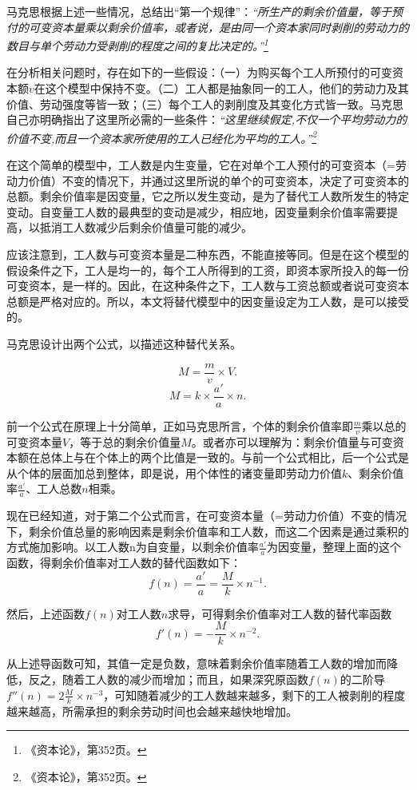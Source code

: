 \documentclass[a4paper,11pt]{ctexart}
\begin{document}
马克思根据上述一些情况，总结出“第一个规律”：\textit{“所生产的剩余价值量，等于预付的可变资本量乘以剩余价值率，或者说，是由同一个资本家同时剥削的劳动力的数目与单个劳动力受剥削的程度之间的复比决定的。”\footnote{《资本论》，第352页。}}

在分析相关问题时，存在如下的一些假设：（一）为购买每个工人所预付的可变资本额$v$在这个模型中保持不变。（二）工人都是抽象同一的工人，他们的劳动力及其价值、劳动强度等皆一致；（三）每个工人的剥削度及其变化方式皆一致。马克思自己亦明确指出了这里所必需的一些条件：\textit{“这里继续假定,不仅一个平均劳动力的价值不变,而且一个资本家所使用的工人已经化为平均的工人。”\footnote{《资本论》，第352页。}}

在这个简单的模型中，工人数是内生变量，它在对单个工人预付的可变资本（=劳动力价值）不变的情况下，并通过这里所说的单个的可变资本，决定了可变资本的总额。剩余价值率是因变量，它之所以发生变动，是为了替代工人数所发生的特定变动。自变量工人数的最典型的变动是减少，相应地，因变量剩余价值率需要提高，以抵消工人数减少后剩余价值量可能的减少。

应该注意到，工人数与可变资本量是二种东西，不能直接等同。但是在这个模型的假设条件之下，工人是均一的，每个工人所得到的工资，即资本家所投入的每一份可变资本，是一样的。因此，在这种条件之下，工人数与工资总额或者说可变资本总额是严格对应的。所以，本文将替代模型中的因变量设定为工人数，是可以接受的。

马克思设计出两个公式，以描述这种替代关系。

$$M = \frac{m}{v} \times V.$$
$$M = k \times \frac{a'}{a} \times n.$$

前一个公式在原理上十分简单，正如马克思所言，个体的剩余价值率即$\frac{m}{v}$乘以总的可变资本量$V$，等于总的剩余价值量$M$。或者亦可以理解为：剩余价值量与可变资本额在总体上与在个体上的两个比值是一致的。与前一个公式相比，后一个公式是从个体的层面加总到整体，即是说，用个体性的诸变量即劳动力价值$k$、剩余价值率$\frac{a'}{a}$、工人总数$n$相乘。

现在已经知道，对于第二个公式而言，在可变资本量（=劳动力价值）不变的情况下，剩余价值总量的影响因素是剩余价值率和工人数，而这二个因素是通过乘积的方式施加影响。以工人数n为自变量，以剩余价值率$\frac{a'}{a}$为因变量，整理上面的这个函数，得剩余价值率对工人数的替代函数如下：$$f(n) = \frac{a'}{a} = \frac{M}{k} \times n^{-1}.$$

然后，上述函数$f(n)$对工人数$n$求导，可得剩余价值率对工人数的替代率函数$$f'(n) = -\frac{M}{k}\times n^{-2}.$$

从上述导函数可知，其值一定是负数，意味着剩余价值率随着工人数的增加而降低，反之，随着工人数的减少而增加；而且，如果深究原函数$f(n)$的二阶导$f''(n) = 2\frac{M}{k}\times n^{-3}$，可知随着减少的工人数越来越多，剩下的工人被剥削的程度越来越高，所需承担的剩余劳动时间也会越来越快地增加。
\end{document}
